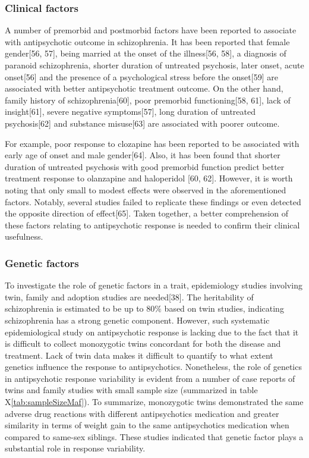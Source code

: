 \documentclass[12pt]{report}
\begin{document}
			\subsubsection{Clinical factors}
				A number of premorbid and postmorbid factors have been reported to associate with antipsychotic outcome in schizophrenia. 
				It has been reported that female gender[56, 57], being married at the onset of the illness[56, 58], a diagnosis of paranoid schizophrenia, shorter duration of untreated psychosis, later onset, acute onset[56] and the presence of a psychological stress before the onset[59] are associated with better antipsychotic treatment outcome. 
				On the other hand, family history of schizophrenia[60], poor premorbid functioning[58, 61], lack of insight[61], severe negative symptoms[57], long duration of untreated psychosis[62] and substance misuse[63] are associated with poorer outcome. 
				
				For example, poor response to clozapine has been reported to be associated with early age of onset and male gender[64].  
				Also, it has been found that shorter duration of untreated psychosis with good premorbid function predict better treatment response to olanzapine and haloperidol [60, 62]. 
				However, it is worth noting that only small to modest effects were observed in the aforementioned factors. 
				Notably, several studies failed to replicate these findings or even detected the opposite direction of effect[65].
				Taken together, a better comprehension of these factors relating to antipsychotic response is needed to confirm their clinical usefulness. 
			\subsubsection{Genetic factors} 
				To investigate the role of genetic factors in a trait, epidemiology studies involving twin, family and adoption studies are needed[38]. 
				The heritability of schizophrenia is estimated to be up to 80$\%$ based on twin studies, indicating schizophrenia has a strong genetic component. 
				However, such systematic epidemiological study on antipsychotic response is lacking due to the fact that it is difficult to collect monozygotic twins concordant for both the disease and treatment. 
				Lack of twin data makes it difficult to quantify to what extent genetics influence the response to antipsychotics.
				Nonetheless, the role of genetics in antipsychotic response variability is evident from a number of case reports of twins and family studies with small sample size (summarized in table X\ref{tab:sampleSizeMaf}). 
				To summarize, monozygotic twins demonstrated the same adverse drug reactions with different antipsychotics medication and greater similarity in terms of weight gain to the same antipsychotics medication when compared to same-sex siblings.
				These studies indicated that genetic factor plays a substantial role in response variability. 
\end{document}
